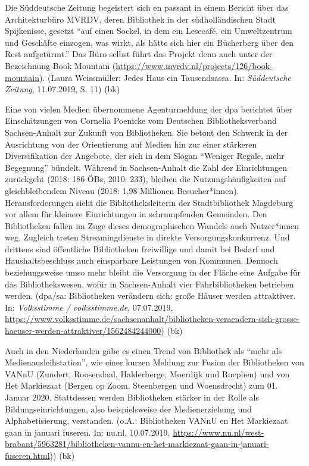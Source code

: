 \documentclass[a4paper,
fontsize=11pt,
oneside,
numbers=noperiodatend,
parskip=half-,
bibliography=totoc,
final
]{scrartcl}
\begin{document}
Die Süddeutsche Zeitung begeistert sich en passant in einem Bericht über
das Architekturbüro MVRDV, deren Bibliothek in der südholländischen
Stadt Spijkenisse, gesetzt \enquote{auf einen Sockel, in dem ein
Lesecafé, ein Umweltzentrum und Geschäfte einzogen, was wirkt, als hätte
sich hier ein Bücherberg über den Rest aufgetürmt.} Das Büro selbst
führt das Projekt denn auch unter der Bezeichnung Book Mountain
(\url{https://www.mvrdv.nl/projects/126/book-mountain}). (Laura
Weissmüller: Jedes Haus ein Tausendsassa. In: \emph{Süddeutsche
Zeitung}, 11.07.2019, S. 11) (bk)

Eine von vielen Medien übernommene Agenturmeldung der dpa berichtet über
Einschätzungen von Cornelia Poenicke vom Deutschen Bibliotheksverband
Sachsen-Anhalt zur Zukunft von Bibliotheken. Sie betont den Schwenk in
der Ausrichtung von der Orientierung auf Medien hin zur einer stärkeren
Diversifikation der Angebote, der sich in dem Slogan \enquote{Weniger
Regale, mehr Begegnung} bündelt. Während in Sachsen-Anhalt die Zahl der
Einrichtungen zurückgeht (2018: 186 ÖBs, 2010: 233), bleiben die
Nutzungshäufigkeiten auf gleichbleibendem Niveau (2018: 1,98 Millionen
Besucher*innen). Herausforderungen sieht die Bibliotheksleiterin der
Stadtbibliothek Magdeburg vor allem für kleinere Einrichtungen in
schrumpfenden Gemeinden. Den Bibliotheken fallen im Zuge dieses
demographischen Wandels auch Nutzer*innen weg. Zugleich treten
Streamingdienste in direkte Versorgungskonkurrenz. Und drittens sind
öffentliche Bibliotheken freiwillige und damit bei Bedarf und
Haushaltsbeschluss auch einsparbare Leistungen von Kommunen. Dennoch
beziehungsweise umso mehr bleibt die Versorgung in der Fläche eine
Aufgabe für das Bibliothekswesen, wofür in Sachsen-Anhalt vier
Fahrbibliotheken betrieben werden. (dpa/sa: Bibliotheken verändern sich:
große Häuser werden attraktiver. In: \emph{Volksstimme /
volksstimme.de}, 07.07.2019,
\url{https://www.volksstimme.de/sachsenanhalt/bibliotheken-veraendern-sich-grosse-haeuser-werden-attraktiver/1562484244000})
(bk)

Auch in den Niederlanden gäbe es einen Trend von Bibliothek als
\enquote{mehr als Medienausleihstation}, wie einer kurzen Meldung zur
Fusion der Bibliotheken von VANnU (Zundert, Roosendaal, Halderberge,
Moerdijk und Rucphen) und von Het Markiezaat (Bergen op Zoom,
Steenbergen und Woensdrecht) zum 01. Januar 2020. Stattdessen werden
Bibliotheken stärker in der Rolle als Bildungseinrichtungen, also
beispielsweise der Medienerziehung und Alphabetisierung, verstanden.
(o.A.: Bibliotheken VANnU en Het Markiezaat gaan in januari fuseren. In:
nu.nl, 10.07.2019,
\url{https://www.nu.nl/west-brabant/5963281/bibliotheken-vannu-en-het-markiezaat-gaan-in-januari-fuseren.html}))
(bk)
\end{document}
